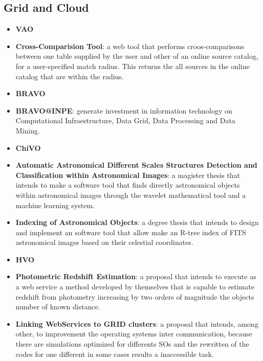 
\subsection{Grid and Cloud}
\begin{itemize}
\item \textbf{VAO}
\item \textbf{Cross-Comparision Tool}:
a web tool that performs croos-comparisons between one table supplied by the
user and other of an online source catalog, for a user-specified match radius.
This returns the all sources in the online catalog that are within the radius.

\item \textbf{BRAVO}
\item \textbf{BRAVO@INPE}:
generate investment in information technology on Computational Infraestructure,
Data Grid, Data Processing and Data Mining.

\item \textbf{ChiVO}
\item \textbf{Automatic Astronomical Different Scales Structures Detection and
Classification within Astronomical Images}:
a magister thesis that intends to make a software tool that finds directly
astronomical objects within astronomical images through the wavelet mathematical
tool and a machine learning system.

\item \textbf{Indexing of Astronomical Objects}:
a degree thesis that intends to design and implement an software tool that allow
make an R-tree index of FITS astronomical images based on their celestial
coordinates.

\item \textbf{HVO}
\item \textbf{Photometric Redshift Estimation}:
a proposal that intends to execute as a web service a method developed by
themselves that is capable to estimate redshift from photometry increasing by
two orders of magnitude the objects number of known distance. 

\item \textbf{Linking WebServices to GRID clusters}:
a proposal that intends, among other, to improvement the operating systems inter
communication, because there are simulations optimized for differents SOs and
the rewritten of the codes for one different in some cases results a
inaccessible task.


\end{itemize}
